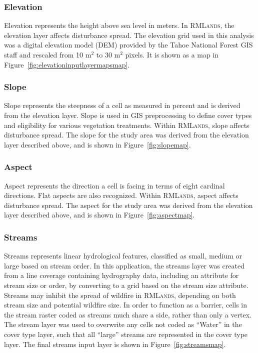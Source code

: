 \subsubsection{Elevation} 
Elevation represents the height above sea level in meters. In \textsc{RMLands}, the elevation layer affects disturbance spread. The elevation grid used in this analysis was a digital elevation model (DEM) provided by the Tahoe National Forest GIS staff and rescaled from 10 m$^2$ to 30 m$^2$ pixels. It is shown as a map in Figure~\ref{fig:elevationinputlayermapsmap}.



\subsubsection{Slope} 
Slope represents the steepness of a cell as measured in percent and is derived from the elevation layer. Slope is used in GIS preprocessing to define cover types and eligibility for various vegetation treatments. Within \textsc{RMLands}, slope affects disturbance spread. The slope for the study area was derived from the elevation layer described above, and is shown in Figure~\ref{fig:slopemap}.


\subsubsection{Aspect} Aspect represents the direction a cell is facing in terms of eight cardinal directions. Flat aspects are also recognized. Within \textsc{RMLands}, aspect affects disturbance spread. The aspect for the study area was derived from the elevation layer described above, and is shown in Figure~\ref{fig:aspectmap}. 


\subsubsection{Streams} 
Streams represents linear hydrological features, classified as small, medium or large based on stream order. In this application, the streams layer was created from a line coverage containing hydrography data, including an attribute for stream size or order, by converting to a grid based on the stream size attribute. Streams may inhibit the spread of wildfire in \textsc{RMLands}, depending on both stream size and potential wildfire size. In order to function as a barrier, cells in the stream raster coded as streams much share a side, rather than only a vertex. The stream layer was used to overwrite any cells not coded as ``Water'' in the cover type layer, such that all ``large'' streams are represented in the cover type layer.  The final streams input layer is shown in Figure~\ref{fig:streamsmap}.



